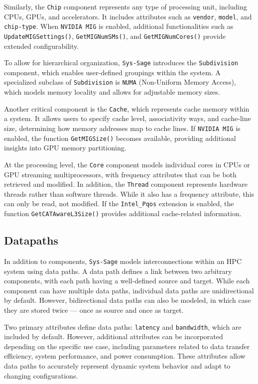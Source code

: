 Similarly, the \texttt{Chip} component represents any type of processing unit, including CPUs, GPUs, and accelerators. It includes attributes such as \texttt{vendor}, \texttt{model}, and \texttt{chip-type}. When \texttt{NVIDIA MIG} is enabled, additional functionalities such as \texttt{UpdateMIGSettings()}, \texttt{GetMIGNumSMs()}, and \texttt{GetMIGNumCores()} provide extended configurability.

To allow for hierarchical organization, \texttt{Sys-Sage} introduces the \texttt{Subdivision} component, which enables user-defined groupings within the system. A specialized subclass of \texttt{Subdivision} is \texttt{NUMA} (Non-Uniform Memory Access), which models memory locality and allows for adjustable memory sizes.

Another critical component is the \texttt{Cache}, which represents cache memory within a system. It allows users to specify cache level, associativity ways, and cache-line size, determining how memory addresses map to cache lines. If \texttt{NVIDIA MIG} is enabled, the function \texttt{GetMIGSize()} becomes available, providing additional insights into GPU memory partitioning.

At the processing level, the \texttt{Core} component models individual cores in CPUs or GPU streaming multiprocessors, with frequency attributes that can be both retrieved and modified. In addition, the \texttt{Thread} component represents hardware threads rather than software threads. While it also has a frequency attribute, this can only be read, not modified. If the \texttt{Intel\_Pqos} extension is enabled, the function \texttt{GetCATAwareL3Size()} provides additional cache-related information.

\subsection{Datapaths}

In addition to components, \texttt{Sys-Sage} models interconnections within an \ac{HPC} system using data paths. A data path defines a link between two arbitrary components, with each path having a well-defined source and target. While each component can have multiple data paths, individual data paths are unidirectional by default. However, bidirectional data paths can also be modeled, in which case they are stored twice — once as source and once as target.

Two primary attributes define data paths: \texttt{latency} and \texttt{bandwidth}, which are included by default. However, additional attributes can be incorporated depending on the specific use case, including parameters related to data transfer efficiency, system performance, and power consumption. These attributes allow data paths to accurately represent dynamic system behavior and adapt to changing configurations.

